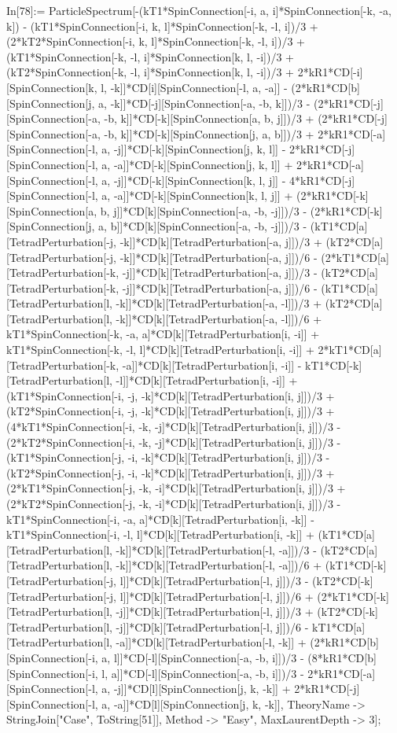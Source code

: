 In[78]:= ParticleSpectrum[-(kT1*SpinConnection[-i, a, i]*SpinConnection[-k, -a, k]) - (kT1*SpinConnection[-i, k, l]*SpinConnection[-k, -l, i])/3 + (2*kT2*SpinConnection[-i, k, l]*SpinConnection[-k, -l, i])/3 + (kT1*SpinConnection[-k, -l, i]*SpinConnection[k, l, -i])/3 + (kT2*SpinConnection[-k, -l, i]*SpinConnection[k, l, -i])/3 + 2*kR1*CD[-i][SpinConnection[k, l, -k]]*CD[i][SpinConnection[-l, a, -a]] - (2*kR1*CD[b][SpinConnection[j, a, -k]]*CD[-j][SpinConnection[-a, -b, k]])/3 - (2*kR1*CD[-j][SpinConnection[-a, -b, k]]*CD[-k][SpinConnection[a, b, j]])/3 + (2*kR1*CD[-j][SpinConnection[-a, -b, k]]*CD[-k][SpinConnection[j, a, b]])/3 + 2*kR1*CD[-a][SpinConnection[-l, a, -j]]*CD[-k][SpinConnection[j, k, l]] - 2*kR1*CD[-j][SpinConnection[-l, a, -a]]*CD[-k][SpinConnection[j, k, l]] + 2*kR1*CD[-a][SpinConnection[-l, a, -j]]*CD[-k][SpinConnection[k, l, j]] - 4*kR1*CD[-j][SpinConnection[-l, a, -a]]*CD[-k][SpinConnection[k, l, j]] + (2*kR1*CD[-k][SpinConnection[a, b, j]]*CD[k][SpinConnection[-a, -b, -j]])/3 - (2*kR1*CD[-k][SpinConnection[j, a, b]]*CD[k][SpinConnection[-a, -b, -j]])/3 - (kT1*CD[a][TetradPerturbation[-j, -k]]*CD[k][TetradPerturbation[-a, j]])/3 + (kT2*CD[a][TetradPerturbation[-j, -k]]*CD[k][TetradPerturbation[-a, j]])/6 - (2*kT1*CD[a][TetradPerturbation[-k, -j]]*CD[k][TetradPerturbation[-a, j]])/3 - (kT2*CD[a][TetradPerturbation[-k, -j]]*CD[k][TetradPerturbation[-a, j]])/6 - (kT1*CD[a][TetradPerturbation[l, -k]]*CD[k][TetradPerturbation[-a, -l]])/3 + (kT2*CD[a][TetradPerturbation[l, -k]]*CD[k][TetradPerturbation[-a, -l]])/6 + kT1*SpinConnection[-k, -a, a]*CD[k][TetradPerturbation[i, -i]] + kT1*SpinConnection[-k, -l, l]*CD[k][TetradPerturbation[i, -i]] + 2*kT1*CD[a][TetradPerturbation[-k, -a]]*CD[k][TetradPerturbation[i, -i]] - kT1*CD[-k][TetradPerturbation[l, -l]]*CD[k][TetradPerturbation[i, -i]] + (kT1*SpinConnection[-i, -j, -k]*CD[k][TetradPerturbation[i, j]])/3 + (kT2*SpinConnection[-i, -j, -k]*CD[k][TetradPerturbation[i, j]])/3 + (4*kT1*SpinConnection[-i, -k, -j]*CD[k][TetradPerturbation[i, j]])/3 - (2*kT2*SpinConnection[-i, -k, -j]*CD[k][TetradPerturbation[i, j]])/3 - (kT1*SpinConnection[-j, -i, -k]*CD[k][TetradPerturbation[i, j]])/3 - (kT2*SpinConnection[-j, -i, -k]*CD[k][TetradPerturbation[i, j]])/3 + (2*kT1*SpinConnection[-j, -k, -i]*CD[k][TetradPerturbation[i, j]])/3 + (2*kT2*SpinConnection[-j, -k, -i]*CD[k][TetradPerturbation[i, j]])/3 - kT1*SpinConnection[-i, -a, a]*CD[k][TetradPerturbation[i, -k]] - kT1*SpinConnection[-i, -l, l]*CD[k][TetradPerturbation[i, -k]] + (kT1*CD[a][TetradPerturbation[l, -k]]*CD[k][TetradPerturbation[-l, -a]])/3 - (kT2*CD[a][TetradPerturbation[l, -k]]*CD[k][TetradPerturbation[-l, -a]])/6 + (kT1*CD[-k][TetradPerturbation[-j, l]]*CD[k][TetradPerturbation[-l, j]])/3 - (kT2*CD[-k][TetradPerturbation[-j, l]]*CD[k][TetradPerturbation[-l, j]])/6 + (2*kT1*CD[-k][TetradPerturbation[l, -j]]*CD[k][TetradPerturbation[-l, j]])/3 + (kT2*CD[-k][TetradPerturbation[l, -j]]*CD[k][TetradPerturbation[-l, j]])/6 - kT1*CD[a][TetradPerturbation[l, -a]]*CD[k][TetradPerturbation[-l, -k]] + (2*kR1*CD[b][SpinConnection[-i, a, l]]*CD[-l][SpinConnection[-a, -b, i]])/3 - (8*kR1*CD[b][SpinConnection[-i, l, a]]*CD[-l][SpinConnection[-a, -b, i]])/3 - 2*kR1*CD[-a][SpinConnection[-l, a, -j]]*CD[l][SpinConnection[j, k, -k]] + 2*kR1*CD[-j][SpinConnection[-l, a, -a]]*CD[l][SpinConnection[j, k, -k]], TheoryName -> StringJoin["Case", ToString[51]], Method -> "Easy", MaxLaurentDepth -> 3]; 